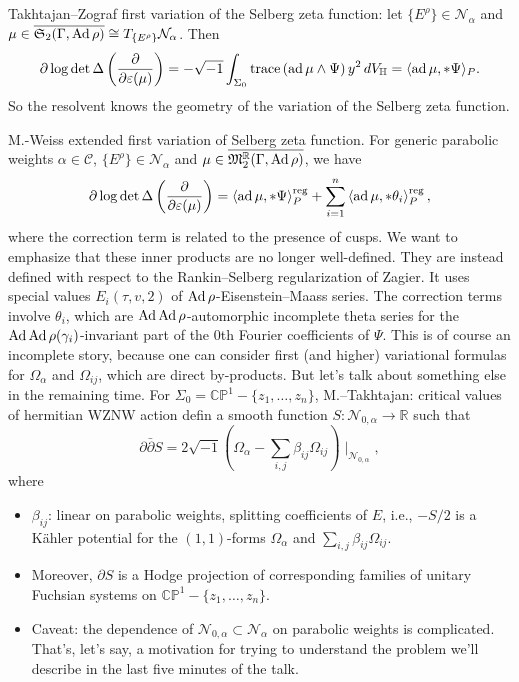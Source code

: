 \documentclass[reqno]{amsart} 
\numberwithin{theorem}{section}
\numberwithin{equation}{section}
\begin{document}
Takhtajan--Zograf first variation of the Selberg zeta function: let $\{E^\rho\} \in \mathcal{N}_\alpha$ and $\mu \in \overline{\mathfrak{S}_2(\Gamma, \operatorname{Ad} \rho)} \cong T_{\{E^\rho\}} \mathcal{N}_\alpha$.  Then
\begin{equation*}
  \partial \log \det \Delta \left( \frac{\partial}{ \partial \varepsilon(\mu)} \right) = - \sqrt{- 1}\int_{\Sigma_0} \operatorname{trace} \left( \operatorname{ad} \mu \wedge \Psi \right) y^2 \, d V_{\mathbb{H}} = \langle \operatorname{ad} \mu, \ast \Psi \rangle_P.
\end{equation*}
So the resolvent knows the geometry of the variation of the Selberg zeta function.

M.-Weiss extended first variation of Selberg zeta function.  For generic parabolic weights $\alpha \in \mathcal{C}$, $\{E^\rho\} \in \mathcal{N}_\alpha$ and $\mu \in \overline{\mathfrak{M}_2^{\mathbb{R}}(\Gamma, \operatorname{Ad} \rho)}$, we have
\begin{equation*}
  \partial \log \det \Delta \left( \frac{\partial}{ \partial \varepsilon(\mu)} \right) = \left\langle \operatorname{ad} \mu, \ast \Psi \right\rangle_P^{\operatorname{reg}}
  + \sum_{i = 1}^n \left\langle \operatorname{ad} \mu, \ast \theta_i \right\rangle_P^{\operatorname{reg}},
\end{equation*}
where the correction term is related to the presence of cusps. We want to emphasize that these inner products are no longer well-defined.  They are instead defined with respect to the Rankin--Selberg regularization of Zagier.  It uses special values $E_i(\tau, v, 2)$ of $\operatorname{Ad} \rho$-Eisenstein--Maass series.  The correction terms involve $\theta_i$, which are $\operatorname{Ad} \operatorname{Ad} \rho$-automorphic incomplete theta series for the $\operatorname{Ad} \operatorname{Ad} \rho(\gamma_i)$-invariant part of the $0$th Fourier coefficients of $\Psi$.  This is of course an incomplete story, because one can consider first (and higher) variational formulas for $\Omega_\alpha$ and $\Omega_{i j}$, which are direct by-products.  But let's talk about something else in the remaining time.  For $\Sigma_0 = \mathbb{C} \mathbb{P}^1 - \{z_1, \dotsc, z_n\}$, M.--Takhtajan: critical values of hermitian WZNW action defin a smooth function $S : \mathcal{N}_{0, \alpha} \rightarrow \mathbb{R}$ such that
\begin{equation*}
  \partial \bar{\partial} S = 2 \sqrt{- 1} \left( \Omega_\alpha - \sum_{i, j} \beta_{i j} \Omega_{i j} \right) \mid_{\mathcal{N}_{0, \alpha}},
\end{equation*}
where
\begin{itemize}
\item $\beta_{ ij}$: linear on parabolic weights, splitting coefficients of $E$, i.e., $-S/2$ is a K\"{a}hler potential for the $(1,1)$-forms $\Omega_\alpha$ and $\sum_{i, j} \beta_{i j} \Omega_{i j}$.
\item Moreover, $\partial S$ is a Hodge projection of corresponding families of unitary Fuchsian systems on $\mathbb{C} \mathbb{P}^1 - \{z_1, \dotsc, z_n\}$.
\item Caveat: the dependence of $\mathcal{N}_{0, \alpha} \subset \mathcal{N}_\alpha$ on parabolic weights is complicated.  That's, let's say, a motivation for trying to understand the problem we'll describe in the last five minutes of the talk.
\end{itemize}
\end{document}
